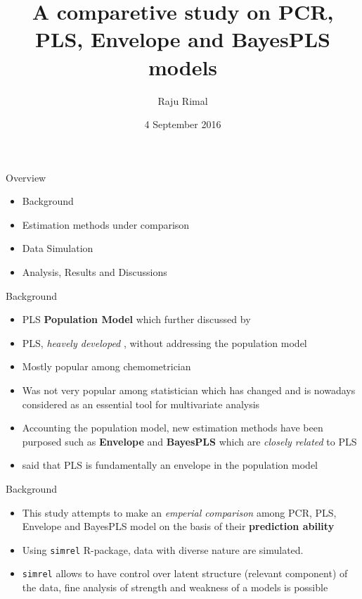 \documentclass[ignorenonframetext,]{beamer}
\title{A comparetive study on PCR, PLS, Envelope and BayesPLS models}
\author{Raju Rimal}
\institute{\textbf{Supervisors}\\
Solve Sæbø, Tryge Almøy\\
\&\\
\textbf{Joint work with}\\
Inge Halland, UiO}
\date{4 September 2016}
\providecommand{\tightlist}{%
  \setlength{\itemsep}{0pt}\setlength{\parskip}{0pt}}
\begin{document}
\frame{\titlepage}

\begin{frame}{Overview}

\begin{itemize}
\tightlist
\item
  Background
\item
  Estimation methods under comparison
\item
  Data Simulation
\item
  Analysis, Results and Discussions
\end{itemize}

\end{frame}

\begin{frame}{Background}

\begin{itemize}[<+->]
\tightlist
\item
  PLS \textbf{Population Model} \citep{helland1990partial} which further
  discussed by \citep{naes1993relevant, helland2001some}
\item
  PLS, \emph{heavely developed}
  \citep{wold1985partial, naes1993relevant, de1993simpls}, without
  addressing the population model \citep{cook2013envelopes}
\item
  Mostly popular among chemometrician
\item
  Was not very popular among statistician which has changed and is
  nowadays considered as an essential tool for multivariate analysis
\item
  Accounting the population model, new estimation methods have been
  purposed such as \textbf{Envelope}
  \citep{cook2010envelope, cook2016algorithms} and \textbf{BayesPLS}
  \citep{helland2012near} which are \emph{closely related} to PLS
\item
  \citet{cook2013envelopes} said that PLS is fundamentally an envelope
  in the population model
\end{itemize}

\end{frame}

\begin{frame}[fragile]{Background}

\begin{itemize}[<+->]
\tightlist
\item
  This study attempts to make an \emph{emperial comparison} among PCR,
  PLS, Envelope and BayesPLS model on the basis of their
  \textbf{prediction ability}
\item
  Using \texttt{simrel} \citep{saebo2015simrel} R-package, data with
  diverse nature are simulated.
\item
  \texttt{simrel} allows to have control over latent structure (relevant
  component) of the data, fine analysis of strength and weakness of a
  models is possible
\end{itemize}

\end{frame}
\end{document}
